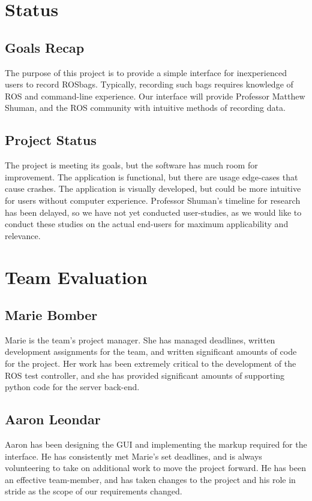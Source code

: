\documentclass[onecolumn, draftclsnofoot,10pt, compsoc]{IEEEtran}
\begin{document}
\section{Status}
\subsection{Goals Recap}
The purpose of this project is to provide a simple interface for inexperienced users to record ROSbags. Typically, recording such bags requires knowledge of ROS and command-line experience. Our interface will provide Professor Matthew Shuman, and the ROS community with intuitive methods of recording data.

\subsection{Project Status}
The project is meeting its goals, but the software has much room for improvement. The application is functional, but there are usage edge-cases that cause crashes. The application is visually developed, but could be more intuitive for users without computer experience. Professor Shuman’s timeline for research has been delayed, so we have not yet conducted user-studies, as we would like to conduct these studies on the actual end-users for maximum applicability and relevance.

\section{Team Evaluation}

\subsection{Marie Bomber}
Marie is the team’s project manager. She has managed deadlines, written development assignments for the team, and written significant amounts of code for the project. Her work has been extremely critical to the development of the ROS test controller, and she has provided significant amounts of supporting python code for the server back-end.
\subsection{Aaron Leondar}
Aaron has been designing the GUI and implementing the markup required for the interface. He has consistently met Marie’s set deadlines, and is always volunteering to take on additional work to move the project forward. He has been an effective team-member, and has taken changes to the project and his role in stride as the scope of our requirements changed.
\end{document}

